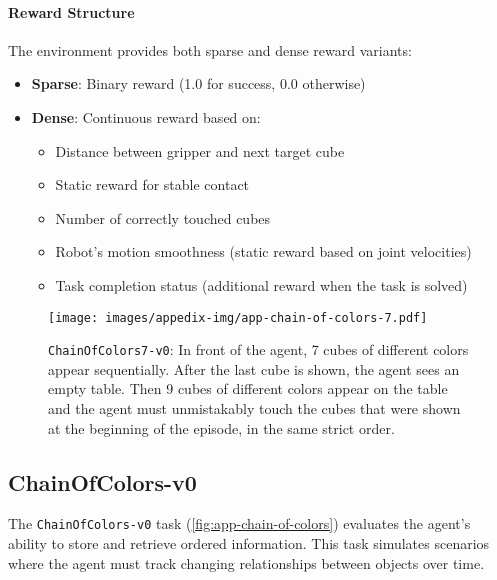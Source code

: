 \paragraph{Reward Structure} The environment provides both sparse and dense reward variants:
\begin{itemize}
    \item \textbf{Sparse}: Binary reward (1.0 for success, 0.0 otherwise)
    \item \textbf{Dense}: Continuous reward based on:
    \begin{itemize}
        \item Distance between gripper and next target cube
        \item Static reward for stable contact
        \item Number of correctly touched cubes
        \item Robot's motion smoothness (static reward based on joint velocities)
        \item Task completion status (additional reward when the task is solved)
    \end{itemize}
\end{itemize}

\newpage
\begin{figure*}[h!]
    \centering
    \texttt{[image: images/appedix-img/app-chain-of-colors-7.pdf]}
    \vspace{-15pt}
    \caption{\texttt{ChainOfColors7-v0}: In front of the agent, 7 cubes of different colors appear sequentially. After the last cube is shown, the agent sees an empty table. Then 9 cubes of different colors appear on the table and the agent must unmistakably touch the cubes that were shown at the beginning of the episode, in the same strict order.}
    \label{fig:app-chain-of-colors}
    \vspace{-15pt}
\end{figure*}
\subsection{ChainOfColors-v0}
\label{app:chain-of-colors}

The \texttt{ChainOfColors-v0} task (\autoref{fig:app-chain-of-colors}) evaluates the agent's ability to store and retrieve ordered information. This task simulates scenarios where the agent must track changing relationships between objects over time.

